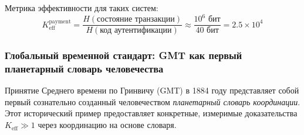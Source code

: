 \documentclass[11pt,a4paper]{article}
\begin{document}
	Метрика эффективности для таких систем:
	\begin{equation}
		K_{\mathrm{eff}}^{\text{payment}} = \frac{H(\text{состояние транзакции})}{H(\text{код аутентификации})} \approx \frac{10^6 \text{ бит}}{40 \text{ бит}} = 2.5 \times 10^4
	\end{equation}
	
	\subsubsection{Глобальный временной стандарт: GMT как первый планетарный словарь человечества}
	\label{subsec:gmt-dictionary}
	
	Принятие Среднего времени по Гринвичу (GMT) в 1884 году представляет собой первый сознательно созданный человечеством \textit{планетарный словарь координации}. Этот исторический пример предоставляет конкретные, измеримые доказательства $K_{\mathrm{eff}} \gg 1$ через координацию на основе словаря.
	
\end{document}
